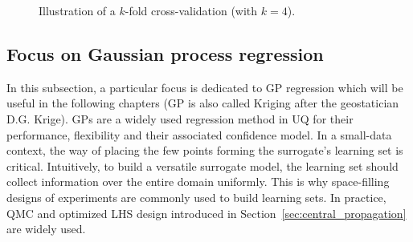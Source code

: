 
\begin{figure}[ht]
    \centering
      \caption{Illustration of a $k$-fold cross-validation (with $k=4$).} 
      \label{fig:kfold}
\end{figure}



\subsection{Focus on Gaussian process regression}

In this subsection, a particular focus is dedicated to GP regression which will be useful in the following chapters (GP is also called Kriging after the geostatician D.G. Krige). 
GPs are a widely used regression method in UQ for their performance, flexibility and their associated confidence model. 
In a small-data context, the way of placing the few points forming the surrogate's learning set is critical. 
Intuitively, to build a versatile surrogate model, the learning set should collect information over the entire domain uniformly. 
This is why space-filling designs of experiments are commonly used to build learning sets. 
In practice, QMC and optimized LHS design introduced in Section~\ref{sec:central_propagation} are widely used.  

